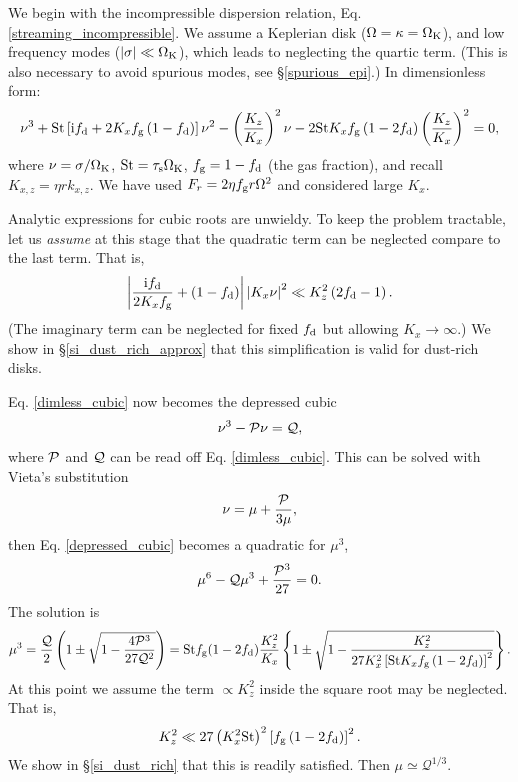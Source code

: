 We begin with the incompressible dispersion
relation, Eq. \ref{streaming_incompressible}. We assume a Keplerian
disk ($\Omega=\kappa=\Omega_{\rm K}$), and low frequency  modes 
($|\sigma|\ll \Omega_{\rm K}$), which leads to neglecting the quartic  
term. (This is also necessary to avoid spurious modes, see
\S\ref{spurious_epi}.)  In dimensionless form:   
\begin{align}
  \nu^3 + \mathrm{St}\left[\mathrm{i}f_\mathrm{d} + 2 K_x f_\mathrm{g} \left(1-f_\mathrm{d}\right)\right]\nu^2
  - \left(\frac{K_z}{K_x}\right)^2\nu - 2\mathrm{St} K_x f_\mathrm{g}
  \left(1-2f_\mathrm{d}\right)\left(\frac{K_z}{K_x}\right)^2 = 0,\label{dimless_cubic}
\end{align}
where $\nu = \sigma/\Omega_{\rm K}$, $\mathrm{St} = \tau_\mathrm{s}\Omega_{\rm K}$, $f_\mathrm{g} = 1-f_\mathrm{d}$ (the gas
fraction), and recall $K_{x,z}=\eta r k_{x,z}$. We have used $F_r =
2\eta f_\mathrm{g} r \Omega^2$ and considered large $K_x$.  

Analytic expressions for cubic roots are unwieldy. To keep the problem
tractable, let us \emph{assume} at this stage that the quadratic term
can be neglected compare to the last term. That is, 
\begin{align}
\left|\frac{\mathrm{i}f_\mathrm{d}}{2K_xf_\mathrm{g}} + \left(1 -
      f_\mathrm{d}\right)\right| \left|K_x\nu\right|^2 \ll
  K_z^2\left(2f_\mathrm{d} - 1\right). \label{min_kz}
\end{align}
(The imaginary term can be
neglected for fixed $f_\mathrm{d}$ but allowing $K_x\to\infty$.) We show in \S\ref{si_dust_rich_approx} that this
simplification is valid for dust-rich disks.  

Eq. \ref{dimless_cubic} now becomes the depressed cubic 
\begin{align}
  \nu^3 - \mathcal{P} \nu = \mathcal{Q}, \label{depressed_cubic}
\end{align}
where $\mathcal{P}$ and $\mathcal{Q}$ can be read off Eq. \ref{dimless_cubic}. This can be
solved with Vieta's substitution 
\begin{align}
\nu = \mu + \frac{\mathcal{P}}{3\mu},\label{si_vieta}
\end{align}
then Eq. \ref{depressed_cubic} becomes a quadratic for $\mu^3$,
\begin{align}
\mu^6 - \mathcal{Q}\mu^3 + \frac{\mathcal{P}^3}{27} = 0. 
\end{align}
The solution is
\begin{align}
  \mu^3 = \frac{\mathcal{Q}}{2}\left(1\pm \sqrt{1 -
      \frac{4\mathcal{P}^3}{27\mathcal{Q}^2}}\right) 
   = \mathrm{St} f_\mathrm{g} (1- 2f_\mathrm{d})\frac{K_z^2}{K_x}\left\{1 \pm \sqrt{1 -
      \frac{K_z^2}{27K_x^2\left[\mathrm{St} K_x f_\mathrm{g}
          \left(1-2f_\mathrm{d}\right)\right]^2}}\right\}.  
\end{align}
At this point we assume the term $\propto K_z^2$ inside the square
root may be neglected. That is, 
\begin{align}
  K_z^2 \ll 27 \left(K_x^2\mathrm{St}\right)^2 \left[f_\mathrm{g}
          \left(1-2f_\mathrm{d}\right)\right]^2. \label{max_kz}
\end{align}
We show in \S\ref{si_dust_rich} that this is readily satisfied. Then
$\mu \simeq \mathcal{Q}^{1/3}$.  

